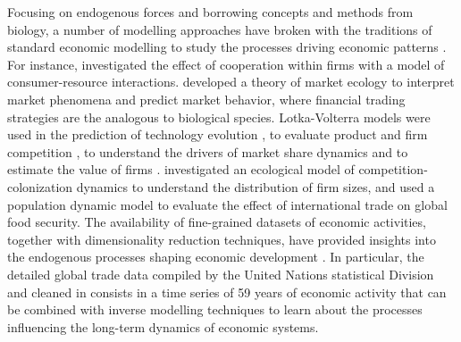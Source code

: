   Focusing on endogenous forces and borrowing concepts and methods from biology, a number of modelling approaches have broken with the traditions of standard economic modelling \citep{10.1093/cje/bet027} to study the processes driving economic patterns \citep{Tacchella2018}.
  For instance, \cite{Saavedra2009a} investigated the effect of cooperation within firms with a model of consumer-resource interactions. \cite{Scholl2020} developed a theory of market ecology to interpret market phenomena and predict market behavior, where financial trading strategies are the analogous to biological species.
  Lotka-Volterra models were used in the prediction of technology evolution \citep{Zhang2018}, to evaluate product and firm competition \citep{Modis1997,Saavedra2014}, to understand the drivers of market share dynamics \citep{Farmer1999,Michalakelis2011,Marasco2016,Gatabazi2019} and to estimate the value of firms \citep{Cauwels56}.
  \cite{Applegate2021} investigated an ecological model of competition-colonization dynamics to understand the distribution of firm sizes, and \cite{Suweis2015} used a population dynamic model to evaluate the effect of international trade on global food security.
  The availability of fine-grained datasets of economic activities, together with dimensionality reduction techniques, have provided insights into the endogenous processes shaping economic development \citep{Mealy2019,Hidalgo2021}.
  In particular, the detailed global trade data compiled by the United Nations statistical Division and cleaned in \cite{Hidalgo2021} consists in a time series of 59 years of economic activity that can be combined with inverse modelling techniques to learn about the processes influencing the long-term dynamics of economic systems.
  
